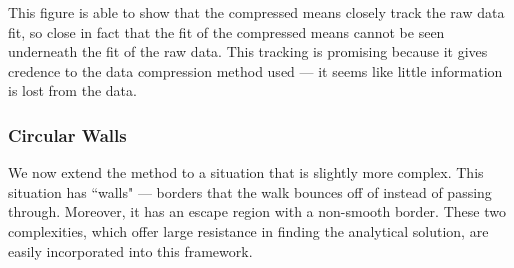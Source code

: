 \documentclass{article}
\begin{document}
			This figure is able to show that the compressed means closely track the raw data fit, so close in fact that the fit of the compressed means cannot be seen underneath the fit of the raw data.
			This tracking is promising because it gives credence to the data compression method used --- it seems like little information is lost from the data.
		\subsubsection{Circular Walls}
			We now extend the method to a situation that is slightly more complex.
			This situation has ``walls" --- borders that the walk bounces off of instead of passing through.
			Moreover, it has an escape region with a non-smooth border.
			These two complexities, which offer large resistance in finding the analytical solution, are easily incorporated into this framework.
\end{document}
